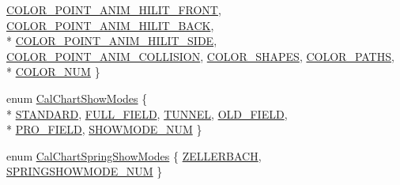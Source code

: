 \begin{DoxyCompactItemize}
\hyperlink{a00191_a09f513be9cbd80355eda10ee8e4059e2a323497ea5cd30905a4adea9c03c7e13c}{C\-O\-L\-O\-R\-\_\-\-P\-O\-I\-N\-T\-\_\-\-A\-N\-I\-M\-\_\-\-H\-I\-L\-I\-T\-\_\-\-F\-R\-O\-N\-T}, 
\hyperlink{a00191_a09f513be9cbd80355eda10ee8e4059e2a47c8e0626e03b753635015815e763d3d}{C\-O\-L\-O\-R\-\_\-\-P\-O\-I\-N\-T\-\_\-\-A\-N\-I\-M\-\_\-\-H\-I\-L\-I\-T\-\_\-\-B\-A\-C\-K}, 
\\*
\hyperlink{a00191_a09f513be9cbd80355eda10ee8e4059e2a37c3445f0f89e2b2f62d901372c2bb5b}{C\-O\-L\-O\-R\-\_\-\-P\-O\-I\-N\-T\-\_\-\-A\-N\-I\-M\-\_\-\-H\-I\-L\-I\-T\-\_\-\-S\-I\-D\-E}, 
\hyperlink{a00191_a09f513be9cbd80355eda10ee8e4059e2a6c694daf41abccf462984f65001c5f5e}{C\-O\-L\-O\-R\-\_\-\-P\-O\-I\-N\-T\-\_\-\-A\-N\-I\-M\-\_\-\-C\-O\-L\-L\-I\-S\-I\-O\-N}, 
\hyperlink{a00191_a09f513be9cbd80355eda10ee8e4059e2a434ac6ba3f7a2c21d1d842d8ab3f1f71}{C\-O\-L\-O\-R\-\_\-\-S\-H\-A\-P\-E\-S}, 
\hyperlink{a00191_a09f513be9cbd80355eda10ee8e4059e2a0a9a72b6b178cdeb49ea0857d9824649}{C\-O\-L\-O\-R\-\_\-\-P\-A\-T\-H\-S}, 
\\*
\hyperlink{a00191_a09f513be9cbd80355eda10ee8e4059e2a1ad5b60f3b4357df62b270dc435e151d}{C\-O\-L\-O\-R\-\_\-\-N\-U\-M}
 \}
\item 
enum \hyperlink{a00191_acf773163120190d181b9f53d1fa4bb9c}{Cal\-Chart\-Show\-Modes} \{ \\*
\hyperlink{a00191_acf773163120190d181b9f53d1fa4bb9ca9de934790934fe831fe946c851e8338e}{S\-T\-A\-N\-D\-A\-R\-D}, 
\hyperlink{a00191_acf773163120190d181b9f53d1fa4bb9caafd983a5fbdfd21c09a0344329b03e8b}{F\-U\-L\-L\-\_\-\-F\-I\-E\-L\-D}, 
\hyperlink{a00191_acf773163120190d181b9f53d1fa4bb9ca555e78b69c3455231890f1ab2cfc606a}{T\-U\-N\-N\-E\-L}, 
\hyperlink{a00191_acf773163120190d181b9f53d1fa4bb9ca29984848cc51bb733e178ce9885428b7}{O\-L\-D\-\_\-\-F\-I\-E\-L\-D}, 
\\*
\hyperlink{a00191_acf773163120190d181b9f53d1fa4bb9ca99cd4dc5ae81db807347f6a3a87e6a3d}{P\-R\-O\-\_\-\-F\-I\-E\-L\-D}, 
\hyperlink{a00191_acf773163120190d181b9f53d1fa4bb9ca39ab6edfbd568a04aacfb5ae6a43cb12}{S\-H\-O\-W\-M\-O\-D\-E\-\_\-\-N\-U\-M}
 \}
\item 
enum \hyperlink{a00191_ae3fb6f10d83fa2ee9e5cb18156a5b932}{Cal\-Chart\-Spring\-Show\-Modes} \{ \hyperlink{a00191_ae3fb6f10d83fa2ee9e5cb18156a5b932a6889dd377e52e3b08fefd9a313ef1f3f}{Z\-E\-L\-L\-E\-R\-B\-A\-C\-H}, 
\hyperlink{a00191_ae3fb6f10d83fa2ee9e5cb18156a5b932aaedac2791ff57e50494f873148ddeef3}{S\-P\-R\-I\-N\-G\-S\-H\-O\-W\-M\-O\-D\-E\-\_\-\-N\-U\-M}
 \}
\end{DoxyCompactItemize}
